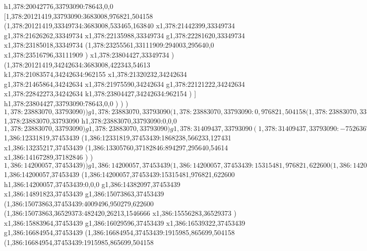 {h1,378:20042776,33793090:78643,0,0
[1,378:20121419,33793090:3683008,976821,504158
(1,378:20121419,33349734:3683008,533465,163840
x1,378:21442399,33349734
g1,378:21626262,33349734
x1,378:22135988,33349734
g1,378:22281620,33349734
x1,378:23185018,33349734
(1,378:23255561,33111909:294003,295640,0
x1,378:23516796,33111909
)
x1,378:23804427,33349734
)
(1,378:20121419,34242634:3683008,422343,54613
k1,378:21083574,34242634:962155
x1,378:21320232,34242634
g1,378:21465864,34242634
x1,378:21975590,34242634
g1,378:22121222,34242634
x1,378:22842273,34242634
k1,378:23804427,34242634:962154
)
]
h1,378:23804427,33793090:78643,0,0
)
)
)
$1,378:23883070,33793090
)
)
g1,378:23883070,33793090
(1,378:23883070,33793090:0,976821,504158
(1,378:23883070,33793090:0,0,0
$1,378:23883070,33793090
h1,378:23883070,33793090:0,0,0
$1,378:23883070,33793090
)
g1,378:23883070,33793090
)
g1,378:31409437,33793090
(1,378:31409437,33793090:-7526367,976821,504158
)
g1,378:23883070,33793090
)
(1,381:10437920,35676976:20971518,455111,127431
(1,380:10437920,35676976:0,291271,0
g1,380:10437920,35676976
g1,380:9127198,35676976
g1,380:8799518,35676976
(1,380:8799518,35676976:1310722,291271,0
k1,380:10110240,35676976:1310722
(1,380:10110240,35676976:0,291271,0
k1,380:9782559,35676976:-327681
x1,380:10110240,35676976
)
)
g1,380:10437920,35676976
)
x1,380:13186798,35676976
g1,380:13405251,35676976
x1,380:14756023,35676976
k1,381:31409438,35676976:16653415
g1,381:31409438,35676976
)
(1,386:10437920,37453439:19077618,976821,622600
g1,386:12331819,37453439
(1,386:12331819,37453439:1868238,976821,622600
g1,386:12331819,37453439
(1,386:12331819,37453439:0,550500,235932
[1,386:12331819,37453439:0,550500,235932
(1,21:12331819,37453439:0,550500,235932
r1,386:12331819,37453439:0,786432,235932
)
]
)
(1,386:12331819,37453439:1868238,566233,127431
$1,386:12331819,37453439
(1,386:12331819,37453439:1868238,566233,127431
x1,386:13235217,37453439
(1,386:13305760,37182846:894297,295640,54614
x1,386:14167289,37182846
)
)
$1,386:14200057,37453439
)
)
g1,386:14200057,37453439
(1,386:14200057,37453439:15315481,976821,622600
(1,386:14200057,37453439:15315481,976821,622600
$1,386:14200057,37453439
(1,386:14200057,37453439:15315481,976821,622600
h1,386:14200057,37453439:0,0,0
g1,386:14382097,37453439
x1,386:14891823,37453439
g1,386:15073863,37453439
(1,386:15073863,37453439:4009496,950279,622600
(1,386:15073863,36529373:482420,26213,1546666
x1,386:15556283,36529373
)
x1,386:15883964,37453439
g1,386:16029596,37453439
x1,386:16539322,37453439
g1,386:16684954,37453439
(1,386:16684954,37453439:1915985,865699,504158
(1,386:16684954,37453439:1915985,865699,504158
}

